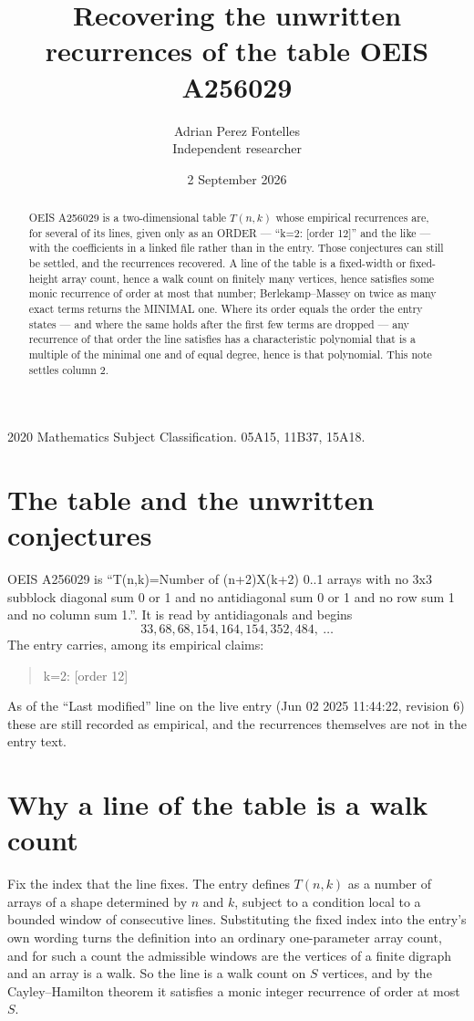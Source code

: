 \documentclass[11pt,a4paper]{article}
\title{Recovering the unwritten recurrences of the table OEIS A256029}
\author{Adrian Perez Fontelles\\ \small Independent researcher}
\date{2 September 2026}
\theoremstyle{plain}
\theoremstyle{definition}
\begin{document}
\maketitle

\begin{abstract}
OEIS A256029 is a two-dimensional table $T(n,k)$ whose empirical recurrences are, for several of
its lines, given only as an ORDER --- ``k=2: [order 12]'' and the like --- with the
coefficients in a linked file rather than in the entry. Those conjectures can still be settled,
and the recurrences recovered. A line of the table is a fixed-width or fixed-height array
count, hence a walk count on finitely many vertices, hence satisfies some monic recurrence of
order at most that number; Berlekamp--Massey on twice as many exact terms returns the MINIMAL
one. Where its order equals the order the entry states --- and where the same holds after the
first few terms are dropped --- any recurrence of that order the line satisfies has a
characteristic polynomial that is a multiple of the minimal one and of equal degree, hence is
that polynomial. This note settles column 2.
\end{abstract}

\noindent\small 2020 Mathematics Subject Classification. 05A15, 11B37, 15A18.\normalsize

\section{The table and the unwritten conjectures}

OEIS A256029 is ``T(n,k)=Number of (n+2)X(k+2) 0..1 arrays with no 3x3 subblock diagonal sum 0 or 1 and no antidiagonal sum 0 or 1 and no row sum 1 and no column sum 1.''. It is read by antidiagonals and begins
\[
33, 68, 68, 154, 164, 154, 352, 484,\ \dots
\]
The entry carries, among its empirical claims:
\begin{quote}\small
k=2: [order 12]
\end{quote}
As of the ``Last modified'' line on the live entry (Jun 02 2025 11:44:22, revision 6) these are still
recorded as empirical, and the recurrences themselves are not in the entry text.

\section{Why a line of the table is a walk count}

Fix the index that the line fixes. The entry defines $T(n,k)$ as a number of arrays of a shape
determined by $n$ and $k$, subject to a condition local to a bounded window of consecutive
lines. Substituting the fixed index into the entry's own wording turns the definition into an
ordinary one-parameter array count, and for such a count the admissible windows are the
vertices of a finite digraph and an array is a walk. So the line is a walk count on $S$
vertices, and by the Cayley--Hamilton theorem it satisfies a monic integer recurrence of order
at most $S$.
\end{document}
